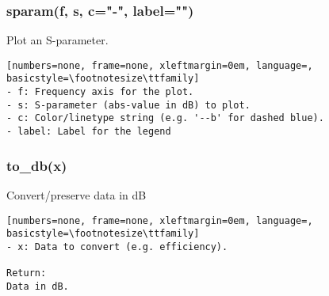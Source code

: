 \subsubsection{sparam(f, s, c="-", label="")}
Plot an S-parameter.

\begin{lstlisting}[numbers=none, frame=none, xleftmargin=0em, language=, basicstyle=\footnotesize\ttfamily]
- f: Frequency axis for the plot.
- s: S-parameter (abs-value in dB) to plot.
- c: Color/linetype string (e.g. '--b' for dashed blue).
- label: Label for the legend
\end{lstlisting}

\subsubsection{to\_db(x)}
Convert/preserve data in dB

\begin{lstlisting}[numbers=none, frame=none, xleftmargin=0em, language=, basicstyle=\footnotesize\ttfamily]
- x: Data to convert (e.g. efficiency).

Return:
Data in dB.
\end{lstlisting}

